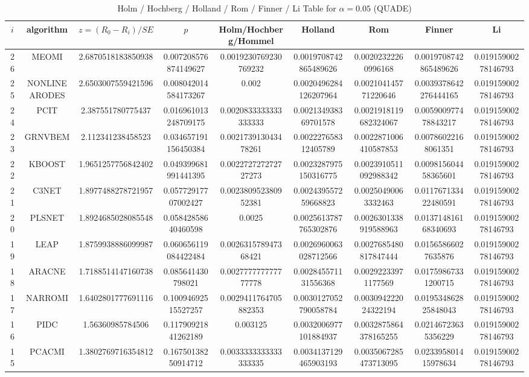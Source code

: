 \documentclass[a4paper,10pt]{article}
\begin{document}
\begin{landscape}
\begin{table}[!htp]
\centering\scriptsize
\caption{Holm / Hochberg / Holland / Rom / Finner / Li Table for $\alpha=0.05$ (QUADE)}
\begin{tabular}{ccccccccc}
$i$&algorithm&$z=(R_0 - R_i)/SE$&$p$&Holm/Hochberg/Hommel&Holland&Rom&Finner&Li\\
\hline
26&MEOMI&2.6870518183850938&0.007208576874149627&0.0019230769230769232&0.0019708742865489626&0.00202322260996168&0.0019708742865489626&0.01915900278146793\\
25&NONLINEARODES&2.6503007559421596&0.008042014584173267&0.002&0.0020496284126207964&0.002104145771220646&0.0039378642276444165&0.01915900278146793\\
24&PCIT&2.387551780775437&0.016961013248709175&0.0020833333333333333&0.002134938369701578&0.0021918119682324067&0.005900977478843217&0.01915900278146793\\
23&GRNVBEM&2.112341238458523&0.034657191156450384&0.002173913043478261&0.002227658312405789&0.0022871006410587853&0.00786022168061351&0.01915900278146793\\
22&KBOOST&1.9651257756842402&0.049399681991441395&0.002272727272727273&0.0023287975150316775&0.0023910511092988342&0.009815604458365601&0.01915900278146793\\
21&C3NET&1.8977488278721957&0.05772917707002427&0.002380952380952381&0.002439557259668823&0.00250490063332463&0.011767133422480591&0.01915900278146793\\
20&PLSNET&1.8924685028085548&0.05842858640460598&0.0025&0.0025613787765302876&0.0026301338919588963&0.013714816168340693&0.01915900278146793\\
19&LEAP&1.8759938886099987&0.060656119084422484&0.002631578947368421&0.0026960063028712566&0.0027685480817847444&0.01565866027635876&0.01915900278146793\\
18&ARACNE&1.7188514147160738&0.085641430798021&0.002777777777777778&0.002845571131556368&0.00292233971177569&0.01759867331200715&0.01915900278146793\\
17&NARROMI&1.6402801777691116&0.10094692515527257&0.0029411764705882353&0.0030127052790058784&0.003094222024322194&0.019534862825848043&0.01915900278146793\\
16&PIDC&1.56360985784506&0.11790921841262189&0.003125&0.0032006977101884937&0.0032875864378165255&0.02146723635356229&0.01915900278146793\\
15&PCACMI&1.3802769716354812&0.16750138250914712&0.0033333333333333335&0.0034137129465903193&0.0035067285473713095&0.023395801415978634&0.01915900278146793\\

\end{tabular}
\end{table}
\end{landscape}
\end{document}

